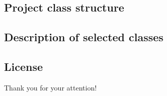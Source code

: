 \documentclass{beamer}
\newcommand{\backupbegin}{
   \newcounter{finalframe}
   \setcounter{finalframe}{\value{framenumber}}
}
\newcommand{\backupend}{
   \setcounter{framenumber}{\value{finalframe}}
}
\begin{document}
\subsection{Project class structure}
\subsection{Description of selected classes}
\subsection{License}

\begin{frame}
\vfill
\centering
\Huge{Thank you for your attention!}

\vfill
\end{frame}

\end{document}

